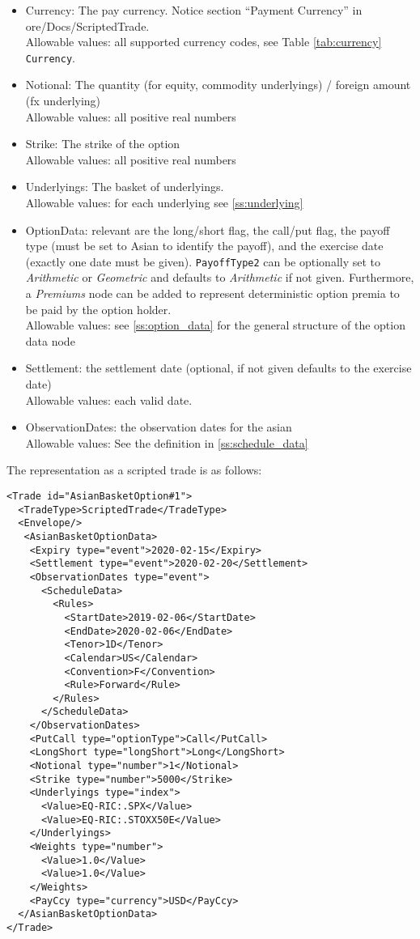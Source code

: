 \begin{itemize}
\item Currency: The pay currency. Notice section ``Payment Currency'' in ore/Docs/ScriptedTrade. \\
  Allowable values: all supported currency codes, see Table \ref{tab:currency} \lstinline!Currency!.
\item Notional: The quantity (for equity, commodity underlyings) / foreign amount (fx underlying) \\
  Allowable values: all positive real numbers
\item Strike: The strike of the option \\
  Allowable values: all positive real numbers
\item Underlyings: The basket of underlyings. \\
  Allowable values: for each underlying see \ref{ss:underlying}
\item OptionData: relevant are the long/short flag, the call/put flag, the payoff type (must be set to Asian to
  identify the payoff), and the exercise date (exactly one date must be given). \lstinline!PayoffType2! can be optionally set to \emph{Arithmetic} or \emph{Geometric} and defaults to \emph{Arithmetic} if not given. Furthermore, a \emph{Premiums} node can be added to represent deterministic option premia to be paid by the option holder. \\
  Allowable values: see \ref{ss:option_data} for the general structure of the option data node
\item Settlement: the settlement date (optional, if not given defaults to the exercise date) \\
  Allowable values: each valid date.
\item ObservationDates: the observation dates for the asian \\
  Allowable values: See the definition in \ref{ss:schedule_data}
\end{itemize}

The representation as a scripted trade is as follows:

\begin{verbatim}
<Trade id="AsianBasketOption#1">
  <TradeType>ScriptedTrade</TradeType>
  <Envelope/>
   <AsianBasketOptionData>
    <Expiry type="event">2020-02-15</Expiry>
    <Settlement type="event">2020-02-20</Settlement>
    <ObservationDates type="event">
      <ScheduleData>
        <Rules>
          <StartDate>2019-02-06</StartDate>
          <EndDate>2020-02-06</EndDate>
          <Tenor>1D</Tenor>
          <Calendar>US</Calendar>
          <Convention>F</Convention>
          <Rule>Forward</Rule>
        </Rules>
      </ScheduleData>
    </ObservationDates>
    <PutCall type="optionType">Call</PutCall>
    <LongShort type="longShort">Long</LongShort>
    <Notional type="number">1</Notional>
    <Strike type="number">5000</Strike>
    <Underlyings type="index">
      <Value>EQ-RIC:.SPX</Value>
      <Value>EQ-RIC:.STOXX50E</Value>
    </Underlyings>
    <Weights type="number">
      <Value>1.0</Value>
      <Value>1.0</Value>
    </Weights>
    <PayCcy type="currency">USD</PayCcy>
  </AsianBasketOptionData>
</Trade>
\end{verbatim}

